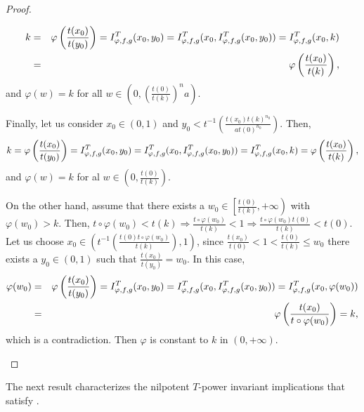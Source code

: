 \begin{proof}
\begin{enumerate}[label=(\roman*)]
\begin{itemize}
\begin{itemize}
			\begin{eqnarray*}
			k &=& \varphi \left(\frac{t(x_0)}{t(y_0)}\right) = I^T_{\varphi,f,g}(x_0,y_0) = I^T_{\varphi,f,g}(x_0,I^T_{\varphi,f,g}(x_0,y_0))= I^T_{\varphi,f,g}(x_0,k) \\
			&=& \varphi \left(\frac{t(x_0)}{t(k)}\right),
			\end{eqnarray*}
			and $\varphi(w)=k$ for all $w \in \left(0,\left(\frac{t(0)}{t(k)}\right)^n a\right)$.
		\end{itemize}
		Finally, let us consider $x_0 \in (0,1)$ and $y_0 < t^{-1} \left(\frac{t(x_0)t(k)^{n_0}}{at(0)^{n_0}}\right)$. Then,
		$$k = \varphi \left(\frac{t(x_0)}{t(y_0)}\right) = I^T_{\varphi,f,g}(x_0,y_0) = I^T_{\varphi,f,g}(x_0,I^T_{\varphi,f,g}(x_0,y_0))= I^T_{\varphi,f,g}(x_0,k) = \varphi \left(\frac{t(x_0)}{t(k)}\right),$$
		and  $\varphi(w)=k$ for al $w \in \left(0,\frac{t(0)}{t(k)}\right)$.			
	\end{itemize}
	On the other hand, assume that there exists a $w_0 \in \left[ \frac{t(0)}{t(k)},+\infty\right)$ with $\varphi(w_0)>k$. Then, $t \circ \varphi (w_0) < t(k) \Rightarrow \frac{t \circ \varphi(w_0)}{t(k)} < 1 \Rightarrow \frac{t \circ \varphi(w_0)t(0)}{t(k)}<t(0)$. Let us choose $x_0 \in \left(t^{-1} \left(\frac{t(0) t \circ \varphi(w_0)}{t(k)}\right),1\right)$, since  $\frac{t(x_0)}{t(0)}<1<\frac{t(0)}{t(k)} \leq w_0$ there exists a $y_0 \in (0,1)$ such that $\frac{t(x_0)}{t(y_0)}=w_0$. In this case,
	\begin{eqnarray*}
	\varphi(w_0) &=& \varphi\left(\frac{t(x_0)}{t(y_0)}\right) = I^T_{\varphi,f,g}(x_0,y_0) = I^T_{\varphi,f,g}(x_0,I^T_{\varphi,f,g}(x_0,y_0)) =I^T_{\varphi,f,g}(x_0,\varphi(w_0)) \\
	&=& \varphi \left(\frac{t(x_0)}{t \circ \varphi(w_0)}\right)=k,
	\end{eqnarray*}
	which is a contradiction. Then $\varphi$ is constant to $k$ in $(0,+\infty)$.
\end{enumerate}
\end{proof}

The next result characterizes the nilpotent $T$-power invariant implications that satisfy \IB.


